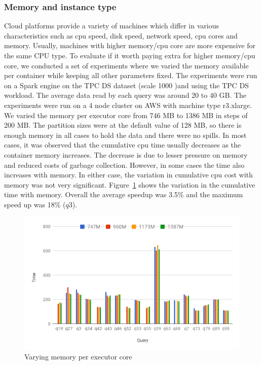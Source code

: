 \noindent\subsubsection*{Memory and instance type}
Cloud platforms provide a variety of machines which differ in various characteristics such as cpu speed, disk speed, network speed, cpu cores and memory. Usually, machines with higher memory/cpu core are more expensive for the same CPU type. To evaluate if it worth paying extra for higher memory/cpu core, we conducted a set of experiments where we varied the memory available per container while keeping all other parameters fixed. The experiments were run on a Spark engine on the TPC DS dataset (scale 1000 )and using the TPC DS workload. The average data read by each query was around 20 to 40 GB. The experiments were run on a 4 node cluster on AWS with machine type r3.xlarge. We varied the memory per executor core from 746 MB to 1386 MB in steps of 200 MB. The partition sizes were at the default value of 128 MB, so there is enough memory in all cases to hold the data and there were no spills. In most cases, it was observed that the cumulative cpu time usually decreases as the container memory increases. The decrease is due to lesser pressure on memory and reduced costs of garbage collection. However, in some cases the time also increases with memory. In either case, the variation in cumulative cpu cost with memory was not very significant. Figure~\ref{fig:varymem} shows the variation in the cumulative time with memory. Overall the average speedup was 3.5\% and the maximum speed up was 18\% ($q3$). 

\begin{figure}[h]
	\includegraphics[width=\linewidth]{fig/varymem.png}
	\caption{Varying memory per executor core \protect\footnotemark[1]}
	\label{fig:varymem}
\end{figure}

